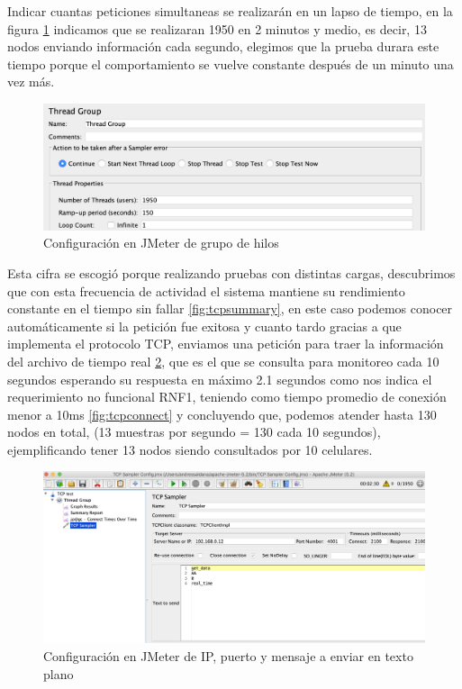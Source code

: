 Indicar cuantas peticiones simultaneas se realizarán en un lapso de tiempo, en la figura \ref{fig:threadgroup} indicamos que se realizaran 1950 en 2 minutos y medio, es decir, 13 nodos enviando información cada segundo, elegimos que la prueba durara este tiempo porque el comportamiento se vuelve constante después de un minuto una vez más.

\begin{figure}[H]
	\centering
	\includegraphics[scale=.3]{Capitulo5/images/tread_group.png}
	\caption{Configuración en JMeter de grupo de hilos}
	\label{fig:threadgroup}
\end{figure} 

Esta cifra se escogió porque realizando pruebas con distintas cargas, descubrimos que con esta frecuencia de actividad el sistema mantiene su rendimiento constante en el tiempo sin fallar \ref{fig:tcpsummary}, en este caso podemos conocer automáticamente si la petición fue exitosa y cuanto tardo gracias a que implementa el protocolo TCP, enviamos una petición para traer la información del archivo de tiempo real \ref{fig:tcpconfig}, que es el que se consulta para monitoreo cada 10 segundos esperando su respuesta en máximo 2.1 segundos como nos indica el requerimiento no funcional RNF1, teniendo como tiempo promedio de conexión menor a 10ms \ref{fig:tcpconnect} y concluyendo que, podemos atender hasta 130 nodos en total, (13 muestras por segundo = 130 cada 10 segundos), ejemplificando tener 13 nodos siendo consultados por 10 celulares. 

\begin{figure}[H]
	\centering
	\includegraphics[scale=.3]{Capitulo5/images/real_time_test_config.png}
	\caption{Configuración en JMeter de IP, puerto y mensaje a enviar en texto plano}
	\label{fig:tcpconfig}
\end{figure} 

